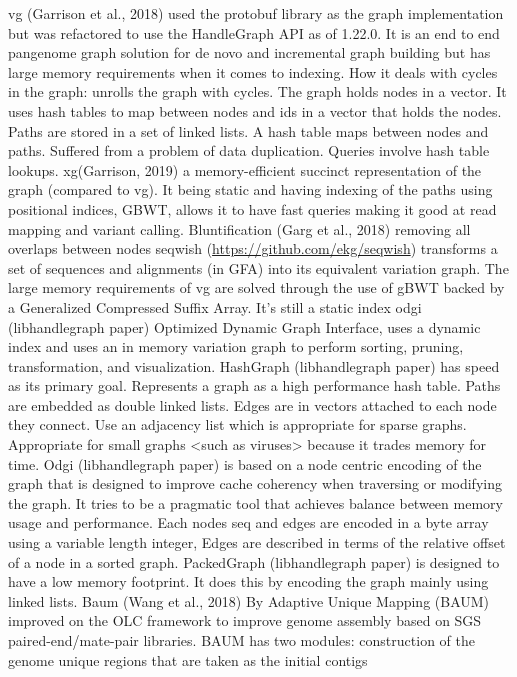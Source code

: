 \documentclass[11pt]{article}
\begin{document}
vg (Garrison et al., 2018) used the protobuf library as the graph implementation but was refactored to use the HandleGraph API as of 1.22.0. It is an end to end pangenome graph solution for de novo and incremental graph building but has large memory requirements when it comes to indexing. How it deals with cycles in the graph: unrolls the graph with cycles. The graph holds nodes in a vector. It uses hash tables to map between nodes and ids in a vector that holds the nodes. Paths are stored in a set of linked lists. A hash table maps between nodes and paths. Suffered from a problem of data duplication. Queries involve hash table lookups.
xg(Garrison, 2019) a memory-efficient succinct representation of the graph (compared to vg). It being static and having indexing of the paths using positional indices, GBWT, allows it to have fast queries making it good at  read mapping and variant calling.
Bluntification (Garg et al., 2018) removing all overlaps between nodes
seqwish (\url{https://github.com/ekg/seqwish}) transforms a set of sequences and alignments (in GFA) into its equivalent variation graph. The large memory requirements of vg are solved through the use of gBWT backed by a Generalized Compressed Suffix Array. It’s still a static index
odgi (libhandlegraph paper) Optimized Dynamic Graph Interface, uses a dynamic index and uses an in memory variation graph to perform sorting, pruning, transformation, and visualization.
HashGraph (libhandlegraph paper) has speed as its primary goal. Represents a graph as a high performance hash table. Paths are embedded as double linked lists. Edges are in vectors attached to each node they connect. Use an adjacency list which is appropriate for sparse graphs. Appropriate for small graphs <such as viruses> because it trades memory for time.
Odgi (libhandlegraph paper) is based on a node centric encoding of the graph that is designed to improve cache coherency when traversing or modifying the graph. It tries to be a pragmatic tool that achieves balance between memory usage and performance. Each nodes seq and edges are encoded in a byte array using a variable length integer,
Edges are described in terms of the relative offset of a node in a sorted graph.
PackedGraph (libhandlegraph paper) is designed to have a low memory footprint. It does this by encoding the graph mainly using linked lists.
Baum (Wang et al., 2018) By Adaptive Unique Mapping (BAUM)  improved on the OLC framework  to improve genome assembly based on SGS paired-end/mate-pair libraries.  BAUM has two modules: 
construction of the genome unique regions that are taken as the initial contigs 
\end{document}
